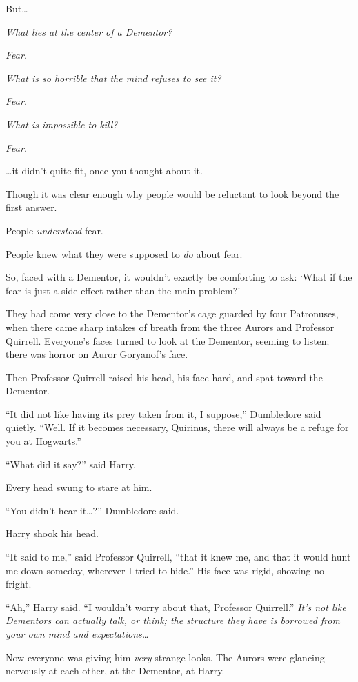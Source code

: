 But\ldots{}

\emph{What lies at the center of a Dementor?}

\emph{Fear.}

\emph{What is so horrible that the mind refuses to see it?}

\emph{Fear.}

\emph{What is impossible to kill?}

\emph{Fear.}

\ldots{}it didn't quite fit, once you thought about it.

Though it was clear enough why people would be reluctant to look beyond
the first answer.

People \emph{understood} fear.

People knew what they were supposed to \emph{do} about fear.

So, faced with a Dementor, it wouldn't exactly be comforting to ask:
`What if the fear is just a side effect rather than the main problem?'

They had come very close to the Dementor's cage guarded by four
Patronuses, when there came sharp intakes of breath from the three
Aurors and Professor Quirrell. Everyone's faces turned to look at the
Dementor, seeming to listen; there was horror on Auror Goryanof's face.

Then Professor Quirrell raised his head, his face hard, and spat toward
the Dementor.

``It did not like having its prey taken from it, I suppose,'' Dumbledore
said quietly. ``Well. If it becomes necessary, Quirinus, there will
always be a refuge for you at Hogwarts.''

``What did it say?'' said Harry.

Every head swung to stare at him.

``You didn't hear it\ldots{}?'' Dumbledore said.

Harry shook his head.

``It said to me,'' said Professor Quirrell, ``that it knew me, and that
it would hunt me down someday, wherever I tried to hide.'' His face was
rigid, showing no fright.

``Ah,'' Harry said. ``I wouldn't worry about that, Professor Quirrell.''
\emph{It's not like Dementors can actually talk, or think; the structure
they have is borrowed from your own mind and expectations\ldots{}}

Now everyone was giving him \emph{very} strange looks. The Aurors were
glancing nervously at each other, at the Dementor, at Harry.


